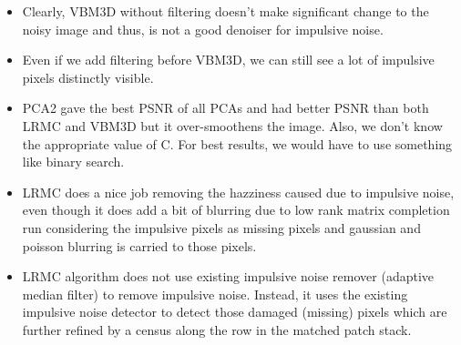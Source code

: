 \documentclass[fleqn, 11pt]{article}
\begin{document}
\begin{itemize}
    \item Clearly, VBM3D without filtering doesn't make significant change to the noisy image and thus, is not a good denoiser for impulsive noise.
  
    \item Even if we add filtering before VBM3D, we can still see a lot of impulsive pixels distinctly visible.
  
    \item PCA2 gave the best PSNR of all PCAs and had better PSNR than both LRMC and VBM3D but it over-smoothens the image. Also, we don't know the appropriate value of C. For best results, we would have to use something like binary search.
  
    \item LRMC does a nice job removing the hazziness caused due to impulsive noise, even though it does add a bit of blurring due to low rank matrix completion run considering the impulsive pixels as missing pixels and gaussian and poisson blurring is carried to those pixels.
    
    \item LRMC algorithm does not use existing impulsive noise remover (adaptive median filter) to remove impulsive noise. Instead, it uses the existing impulsive noise detector to detect those damaged (missing) pixels which are further refined by a census along the row in the matched patch stack.
\end{itemize}
\end{document}
